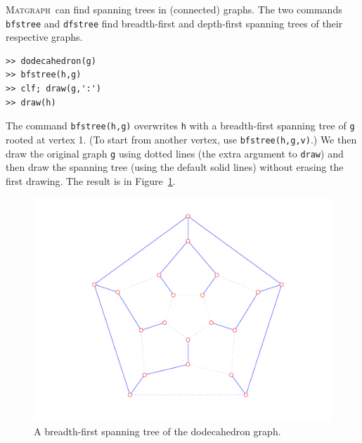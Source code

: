 \documentclass[12pt]{amsart}
\newcommand\matgraph{\textsc{Matgraph}}
\begin{document}
\matgraph\ can find spanning trees in (connected) graphs. The two
commands \verb|bfstree| and \verb|dfstree| find breadth-first and
depth-first spanning trees of their respective graphs. 
\begin{verbatim}
>> dodecahedron(g)
>> bfstree(h,g)
>> clf; draw(g,':')
>> draw(h)
\end{verbatim}
The command \verb|bfstree(h,g)| overwrites \verb|h| with a
breadth-first spanning tree of \verb|g| rooted at vertex 1. (To start
from another vertex, use \verb|bfstree(h,g,v)|.) We then draw the
original graph \verb|g| using dotted lines (the extra argument to
\verb|draw|) and then draw the spanning tree (using the default solid
lines) without erasing the first drawing. The result is in
Figure~\ref{fig:bfstree}.
\begin{figure}[ht]
  \begin{center}
    \includegraphics[scale=0.5]{figs/bfstree}
  \end{center}
  \caption{A breadth-first spanning tree of the dodecahedron graph.}
  \label{fig:bfstree}
\end{figure}
\end{document}
